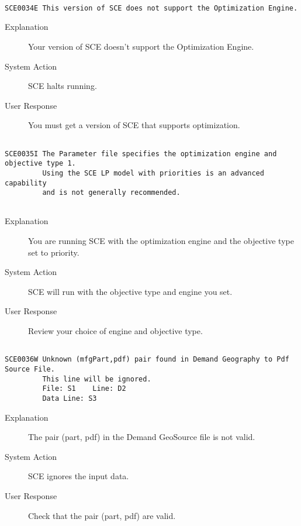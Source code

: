 \hrulefill
\begin{verbatim}

SCE0034E This version of SCE does not support the Optimization Engine.
\end{verbatim}
\begin{description}
\item[Explanation]  Your version of SCE doesn't support the Optimization Engine.

\item[System Action]  SCE halts running.

\item[User Response]  You must get a version of SCE that supports optimization.
\end{description}
\hrulefill
\begin{verbatim}

SCE0035I The Parameter file specifies the optimization engine and objective type 1.
         Using the SCE LP model with priorities is an advanced capability
         and is not generally recommended.
         
\end{verbatim}
\begin{description}
\item[Explanation]  You are running SCE with the optimization engine and
 the objective type set to priority.

\item[System Action]  SCE will run with the objective type and engine you set.

\item[User Response]  Review your choice of engine and objective type.
\end{description}
\hrulefill
\begin{verbatim}

SCE0036W Unknown (mfgPart,pdf) pair found in Demand Geography to Pdf Source File.  
         This line will be ignored.
         File: S1    Line: D2
         Data Line: S3
\end{verbatim}
\begin{description}
\item[Explanation]  The pair (part, pdf) in the Demand GeoSource file is not valid.

\item[System Action]  SCE ignores the input data.

\item[User Response]  Check that the pair (part, pdf) are valid.
\end{description}
